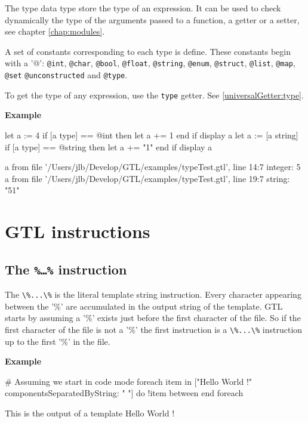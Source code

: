 \documentclass[10pt,openright,twosides]{report}
\newcommand{\gtltype}[1]{{\small\ttfamily #1}}
\newcommand{\ccst}[1]{{\footnotesize\ttfamily\colorbox{light-blue}{'#1'}}}
\newcommand{\gtlinline}[1]{\colorbox{light-blue}{\lstinline[language=gtl]{#1}}}
\newcommand{\example}{\vspace{.75em}\noindent\textbf{Example}\vspace{0em}}
\begin{document}
The \gtltype{type} data type store the type of an expression. It can be used to check dynamically the type of the arguments passed to a function, a getter or a setter, see chapter \ref{chap:modules}.

A set of constants corresponding to each type is define. These constants begin with a \ccst{@}: \gtlinline{@int}, \gtlinline{@char}, \gtlinline{@bool}, \gtlinline{@float}, \gtlinline{@string}, \gtlinline{@enum}, \gtlinline{@struct}, \gtlinline{@list}, \gtlinline{@map}, \gtlinline{@set} \gtlinline{@unconstructed} and \gtlinline{@type}.

To get the type of any expression, use the \gtlinline{type} getter. See \ref{universalGetter:type}.

\example
\begin{gtl}
let a := 4
if [a type] == @int then
  let a += 1
end if
display a
let a := [a string]
if [a type] == @string then
  let a += "1"
end if
display a
\end{gtl}
\begin{console}
a from file '/Users/jlb/Develop/GTL/examples/typeTest.gtl', line 14:7
    integer: 5
a from file '/Users/jlb/Develop/GTL/examples/typeTest.gtl', line 19:7
    string: "51"
\end{console}

\chapter{GTL instructions}

\section{The \texttt{\%\ldots\%} instruction}

The \gtlinline{\%...\%} is the literal template string instruction. Every character appearing between the \ccst{\%} are accumulated in the output string of the template. GTL starts by assuming a \ccst{\%} exists just before the first character of the file. So if the first character of the file is not a \ccst{\%} the first instruction is a \gtlinline{\%...\%} instruction up to the first \ccst{\%} in the file. 

\example
\begin{gtl}
# Assuming we start in code mode
%
foreach item in ["Hello World !" componentsSeparatedByString: " "]
do
  !item
between%
%
end foreach%
%
\end{gtl}
\begin{templateoutput}
This is the output of a template
Hello
World
!
\end{templateoutput}
\end{document}
